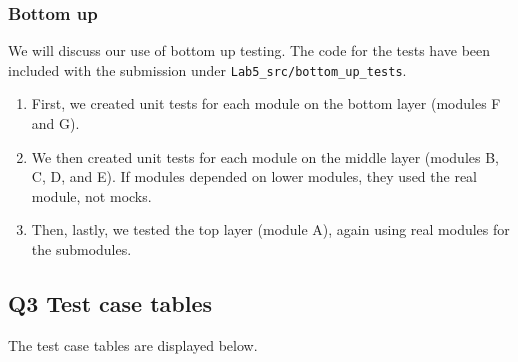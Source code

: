 \documentclass[12pt, letterpaper, titlepage]{article}
\begin{document}
\subsubsection*{Bottom up}
We will discuss our use of bottom up testing. The code for the tests have been included with the submission under \lstinline{Lab5_src/bottom_up_tests}.
\begin{enumerate}
    \item First, we created unit tests for each module on the bottom layer (modules F and G).
    \item We then created unit tests for each module on the middle layer (modules B, C, D, and E). If modules depended on lower modules, they used the real module, not mocks.
    \item Then, lastly, we tested the top layer (module A), again using real modules for the submodules. 
\end{enumerate}

\subsection*{Q3 Test case tables}
The test case tables are displayed below.
\end{document}
